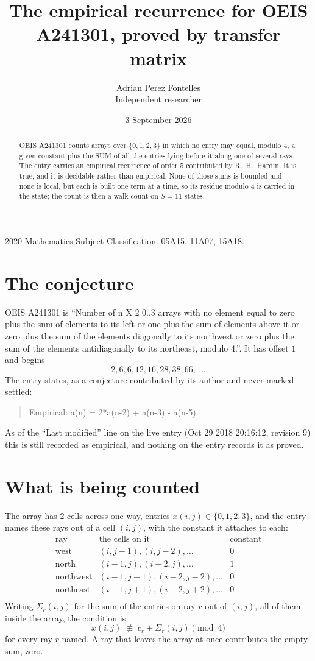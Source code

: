 \documentclass[11pt,a4paper]{article}
\title{The empirical recurrence for OEIS A241301, proved by transfer matrix}
\author{Adrian Perez Fontelles\\ \small Independent researcher}
\date{3 September 2026}
\theoremstyle{plain}
\theoremstyle{definition}
\begin{document}
\maketitle

\begin{abstract}
OEIS A241301 counts arrays over $\{0,1,2,3\}$ in which no entry may equal, modulo $4$, a given
constant plus the SUM of all the entries lying before it along one of several rays. The entry
carries an empirical recurrence of order $5$ contributed by R.~H.~Hardin. It is true, and
it is decidable rather than empirical. None of those sums is bounded and none is local, but
each is built one term at a time, so its residue modulo $4$ is carried in the state; the
count is then a walk count on $S=11$ states.
\end{abstract}

\noindent\small 2020 Mathematics Subject Classification. 05A15, 11A07, 15A18.\normalsize

\section{The conjecture}

OEIS A241301 is ``Number of n X 2 0..3 arrays with no element equal to zero plus the sum of elements to its left or one plus the sum of elements above it or zero plus the sum of the elements diagonally to its northwest or zero plus the sum of the elements antidiagonally to its northeast, modulo 4.''. It has offset $1$ and begins
\[
2, 6, 6, 12, 16, 28, 38, 66,\ \dots
\]
The entry states, as a conjecture contributed by its author and never marked settled:
\begin{quote}
Empirical: a(n) = 2*a(n-2) + a(n-3) - a(n-5).
\end{quote}
As of the ``Last modified'' line on the live entry (Oct 29 2018 20:16:12, revision 9) this is still
recorded as empirical, and nothing on the entry records it as proved.

\section{What is being counted}

The array has $2$ cells across one way, entries $x(i,j)\in\{0,1,2,3\}$, and the entry names these
rays out of a cell $(i,j)$, with the constant it attaches to each:
\[
\begin{array}{lll}
\text{ray} & \text{the cells on it} & \text{constant} \\[2pt]
\text{west} & (i,j-1),(i,j-2),\dots & 0 \\
\text{north} & (i-1,j),(i-2,j),\dots & 1 \\
\text{northwest} & (i-1,j-1),(i-2,j-2),\dots & 0 \\
\text{northeast} & (i-1,j+1),(i-2,j+2),\dots & 0 \\
\end{array}
\]
Writing $\Sigma_r(i,j)$ for the sum of the entries on ray $r$ out of $(i,j)$, all of them
inside the array, the condition is
\[
x(i,j)\;\not\equiv\;c_r+\Sigma_r(i,j) \pmod{4}
\]
for every ray $r$ named. A ray that leaves the array at once contributes the empty sum,
zero.
\end{document}

